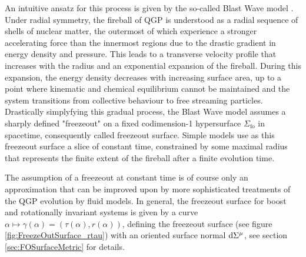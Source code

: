 An intuitive ansatz for this process is given by the so-called Blast Wave model \cite{SiemensRasmussen_1979,FlorkowskiBroniowski_2004,ChenEtAl_2021,JaiswalKoch_2015}. Under radial symmetry, the fireball of QGP is understood as a radial sequence of shells of nuclear matter, the outermost of which experience a stronger accelerating force than the innermost regions due to the drastic gradient in energy density and pressure. This leads to a transverse velocity profile that increases with the radius and an exponential expansion of the fireball. During this expansion, the energy density decreases with increasing surface area, up to a point where kinematic and chemical equilibrium cannot be maintained and the system transitions from collective behaviour to free streaming particles. Drastically simplyfying this gradual process, the Blast Wave model assumes a sharply defined "freezeout" on a fixed codimension-1 hypersurface $\Sigma_{\text{fo}}$ in spacetime, consequently called freezeout surface. Simple models use as this freezeout surface a slice of constant time, constrained by some maximal radius that represents the finite extent of the fireball after a finite evolution time.

The assumption of a freezeout at constant time is of course only an approximation that can be improved upon by more sophisticated treatments of the QGP evolution by fluid models. In general, the freezeout surface for boost and rotationally invariant systems is given by a curve ${\alpha\mapsto\gamma(\alpha)=(\tau(\alpha),r(\alpha))}$, defining the freezeout surface (see figure \ref{fig:FreezeOutSurface_rtau}) with an oriented surface normal $\text{d}\Sigma^\mu$, see section \ref{sec:FOSurfaceMetric} for details. 

